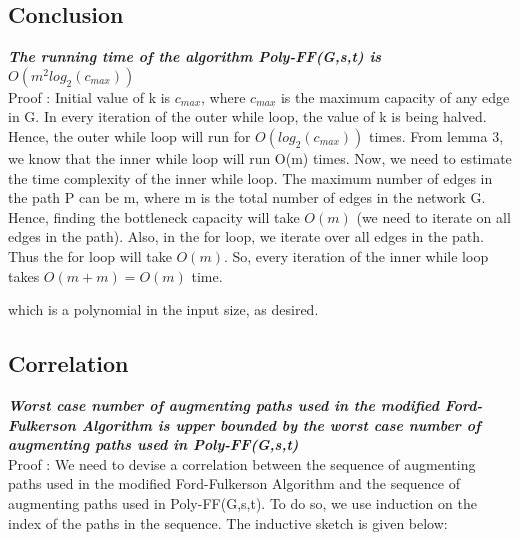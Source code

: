 \documentclass{article}
\begin{document}
\subsection{Conclusion}
\textbf{\textit{The running time of the algorithm Poly-FF(G,s,t) is $O(m^{2}log_{2}(c_{max}))$}}
\vspace{0.2cm}\\
Proof : Initial value of k is $c_{max}$, where $c_{max}$ is the maximum capacity of any edge in G. In every iteration of the outer while loop, the value of k is being halved. Hence, the outer while loop will run for $O(log_{2}(c_{max}))$ times. From lemma 3, we know that the inner while loop will run O(m) times. Now, we need to estimate the time complexity of the inner while loop. The maximum number of edges in the path P can be m, where m is the total number of edges in the network G. Hence, finding the bottleneck capacity will take $O(m)$ (we need to iterate on all edges in the path). Also, in the for loop, we iterate over all edges in the path. Thus the for loop will take $O(m)$. So, every iteration of the inner while loop takes $O(m+m)=O(m)$ time.\\
\begin{center}
\end{center}
which is a polynomial in the input size, as desired.
\newpage
\subsection{Correlation}
\textbf{\textit{Worst case number of augmenting paths used in the modified Ford-Fulkerson Algorithm is upper bounded by the worst case number of augmenting paths used in Poly-FF(G,s,t)}}
\vspace{0.2cm}\\
Proof : We need to devise a correlation between the sequence of augmenting paths used in the modified Ford-Fulkerson Algorithm and the sequence of augmenting paths used in Poly-FF(G,s,t). To do so, we use induction on the index of the paths in the sequence. The inductive sketch is given below:
\end{document}
